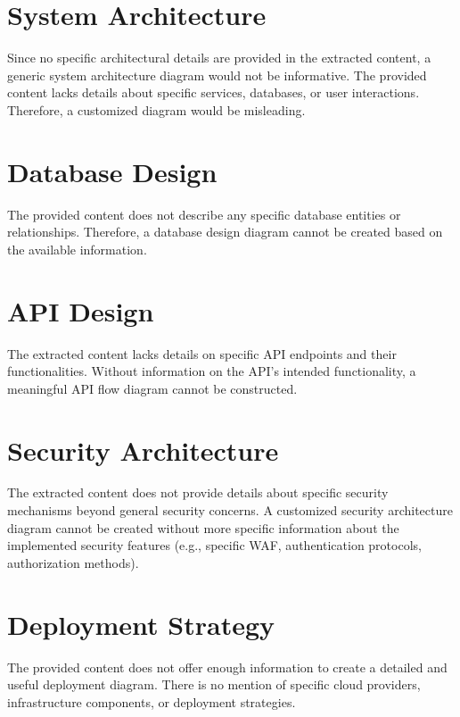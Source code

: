 \documentclass[11pt,a4paper,oneside]{article}
\begin{document}
\section{System Architecture}
Since no specific architectural details are provided in the extracted content, a generic system architecture diagram would not be informative.  The provided content lacks details about specific services, databases, or user interactions.  Therefore, a customized diagram would be misleading.

\section{Database Design}
The provided content does not describe any specific database entities or relationships.  Therefore, a database design diagram cannot be created based on the available information.

\section{API Design}
The extracted content lacks details on specific API endpoints and their functionalities.  Without information on the API's intended functionality, a meaningful API flow diagram cannot be constructed.

\section{Security Architecture}
The extracted content does not provide details about specific security mechanisms beyond general security concerns.  A customized security architecture diagram cannot be created without more specific information about the implemented security features (e.g., specific WAF, authentication protocols, authorization methods).

\section{Deployment Strategy}
The provided content does not offer enough information to create a detailed and useful deployment diagram.  There is no mention of specific cloud providers, infrastructure components, or deployment strategies.
\end{document}
